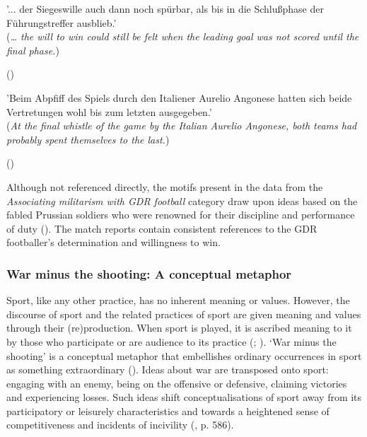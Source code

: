 \begin{displayquote}
\begin{small}
'... der Siegeswille auch dann noch spürbar, als bis in die Schlußphase der Führungstreffer ausblieb.'\\
(\textit{… the will to win could still be felt when the leading goal was not scored until the final phase.})\
\begin{flushright}\footnotesize (\cite{nd19740314})\end{flushright}
\end{small}
\end{displayquote}

\begin{displayquote}
\begin{small}
'Beim Abpfiff des Spiels durch den Italiener Aurelio Angonese hatten sich beide Vertretungen wohl bis zum letzten ausgegeben.'\\
(\textit{At the final whistle of the game by the Italian Aurelio Angonese, both teams had probably spent themselves to the last.})\
\begin{flushright}\footnotesize (\cite{nd19740619})\end{flushright}
\end{small}
\end{displayquote}

Although not referenced directly, the motifs present in the data from the \textit{Associating militarism with GDR football} category draw upon ideas based on the fabled Prussian soldiers who were renowned for their discipline and performance of duty (\cite{jackman2004}). The match reports contain consistent references to the GDR footballer’s determination and willingness to win.

\subsubsection*{War minus the shooting: A conceptual metaphor}

Sport, like any other practice, has no inherent meaning or values. However, the discourse of sport and the related practices of sport are given meaning and values through their (re)production. When sport is played, it is ascribed meaning to it by those who participate or are audience to its practice (\cite{crawford2004}; \cite{giulianotti2005}). ‘War minus the shooting’ is a conceptual metaphor that embellishes ordinary occurrences in sport as something extraordinary (\cite{lakoffjohnson2003}). Ideas about war are transposed onto sport: engaging with an enemy, being on the offensive or defensive, claiming victories and experiencing losses. Such ideas shift conceptualisations of sport away from its participatory or leisurely characteristics and towards a heightened sense of competitiveness and incidents of incivility (\cite{murray2012}, p. 586).


